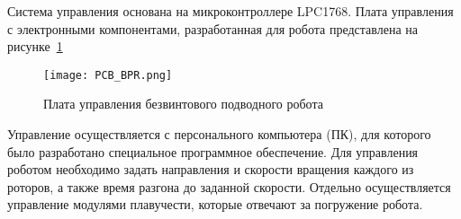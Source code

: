 Система управления основана на микроконтроллере LPC1768. Плата управления с электронными компонентами, разработанная для робота представлена на рисунке~\ref{PCB_BPR}

\begin{figure}[h!]
	\begin{center}
		\texttt{[image: PCB\_BPR.png]}
		\caption{Плата управления безвинтового подводного робота} \label{PCB_BPR}
	\end{center}
\end{figure}

Управление осуществляется с персонального компьютера (ПК), для которого было разработано специальное программное обеспечение. Для управления роботом необходимо задать направления и скорости вращения каждого из роторов, а также время разгона до заданной скорости. Отдельно осуществляется управление модулями плавучести, которые отвечают за погружение робота.



\clearpage